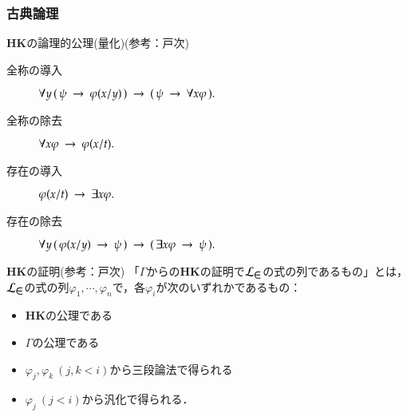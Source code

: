 \documentclass[dvipdfmx,10pt,notheorems]{beamer}
\theoremstyle{definition}
\newcommand{\lang}[1]{\mathcal{L}_{\scalebox{1.2}{$#1$}}} %
\newcommand{\rarrow}{\hspace{0.25em}\rightarrow\hspace{0.25em}} %
\begin{document}
\begin{frame}\frametitle{古典論理}
	\begin{alertblock}{{\bf HK}の論理的公理(量化)(参考：戸次\cite{Bekki})}
		\begin{description}
			\item[全称の導入] $\forall y\, (\, \psi \rarrow \varphi(x/y)\, ) 
				\rarrow (\, \psi \rarrow \forall x \varphi\, ).$
				
			\item[全称の除去] $\forall x \varphi \rarrow \varphi(x/t).$
				
			\item[存在の導入] $\varphi(x/t) \rarrow \exists x \varphi.$
				
			\item[存在の除去] $\forall y\, (\, \varphi(x/y) \rarrow \psi\, )
				\rarrow (\, \exists x \varphi \rarrow \psi\, ).$
		\end{description}
	\end{alertblock}
	
	\begin{exampleblock}{{\bf HK}の証明(参考：戸次\cite{Bekki})}
		「$\Gamma$からの{\bf HK}の証明で$\lang{\in}$の式の列であるもの」とは，
		$\lang{\in}$の式の列$\varphi_{1},\cdots,\varphi_{n}$で，各$\varphi_{i}$が次のいずれかであるもの：
		\begin{itemize}
			\item {\bf HK}の公理である
			\item $\Gamma$の公理である
			\item $\varphi_{j},\varphi_{k}\ (j,k < i)$から三段論法で得られる
			\item $\varphi_{j}\ (j < i)$から汎化で得られる．
		\end{itemize}
	\end{exampleblock}
\end{frame}
\end{document}
